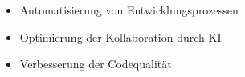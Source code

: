 \begin{itemize}
    \item Automatisierung von Entwicklungsprozessen
    \item Optimierung der Kollaboration durch KI
    \item Verbesserung der Codequalität
\end{itemize}
